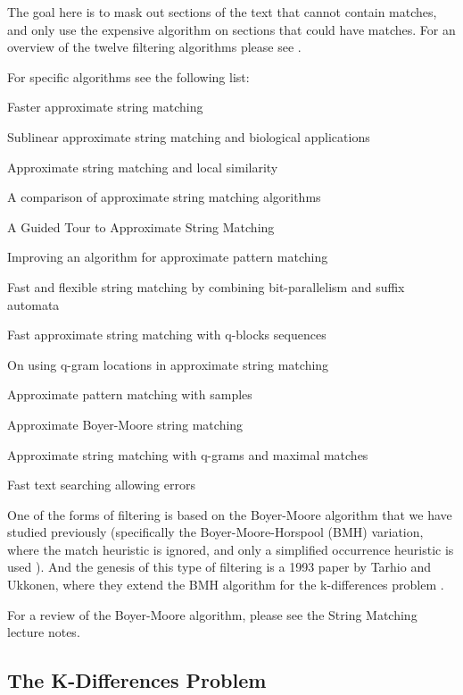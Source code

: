 \documentclass[10pt]{article}
\begin{document}
The goal here is to mask out sections of the text that cannot contain matches, and only use the expensive algorithm on sections that could have matches.
For an overview of the twelve filtering algorithms please see \cite{navarro99}.

For specific algorithms see the following list:

\begin{list}{*}{}
\item Faster approximate string matching \cite{baeza99}
\item Sublinear approximate string matching and biological applications \cite{chang94a}
\item Approximate string matching and local similarity \cite{chang94b}
\item A comparison of approximate string matching algorithms \cite{jokinen96}
\item A Guided Tour to Approximate String Matching \cite{navarro99}
\item Improving an algorithm for approximate pattern matching \cite{navarro98}
\item Fast and flexible string matching by combining bit-parallelism and suffix automata \cite{navarro00}
\item Fast approximate string matching with q-blocks sequences \cite{shi96}
\item On using q-gram locations in approximate string matching \cite{sutinen95}
\item Approximate pattern matching with samples \cite{takaoka94}
\item Approximate Boyer-Moore string matching \cite{taruk93}
\item Approximate string matching with q-grams and maximal matches \cite{ukkonen92}
\item Fast text searching allowing errors \cite{wu92}
\end{list}

One of the forms of filtering is based on the Boyer-Moore algorithm that we have
studied previously (specifically the Boyer-Moore-Horspool (BMH) variation, where
the match heuristic is ignored, and only a simplified occurrence heuristic is used
\cite{taruk93}). And the genesis of this type of filtering is a 1993 paper by Tarhio
and Ukkonen, where they extend the BMH algorithm for the k-differences problem \cite{taruk93}.

For a review of the Boyer-Moore algorithm, please see the String Matching lecture notes.

\subsection*{The K-Differences Problem}
\end{document}
